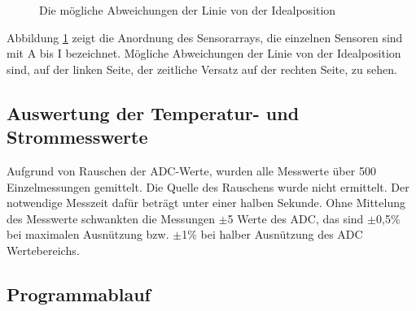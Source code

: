 \documentclass[a4paper,bibtotoc,oneside]{scrbook}
\begin{document}
\begin{figure}
\centering
\caption{Die mögliche Abweichungen der Linie von der Idealposition}
\label{abw}
\end{figure} 

Abbildung \ref{abw} zeigt die Anordnung des Sensorarrays, die einzelnen Sensoren sind mit A bis I bezeichnet. Mögliche Abweichungen der Linie von der Idealposition sind, auf der linken Seite, der zeitliche Versatz auf der rechten Seite, zu sehen.

\subsection{Auswertung der Temperatur- und Strommesswerte}\thispagestyle{empty}
Aufgrund von Rauschen der ADC-Werte, wurden alle Messwerte über 500 Einzelmessungen gemittelt. Die Quelle des Rauschens wurde nicht ermittelt. Der notwendige Messzeit dafür beträgt unter einer halben Sekunde. Ohne Mittelung des Messwerte schwankten die Messungen $\pm$5 Werte des ADC, das sind $\pm$0,5$\%$ bei maximalen Ausnützung bzw. $\pm$1$\%$ bei halber Ausnützung des ADC Wertebereichs.
 
\subsection{Programmablauf}\thispagestyle{empty}
\end{document}
